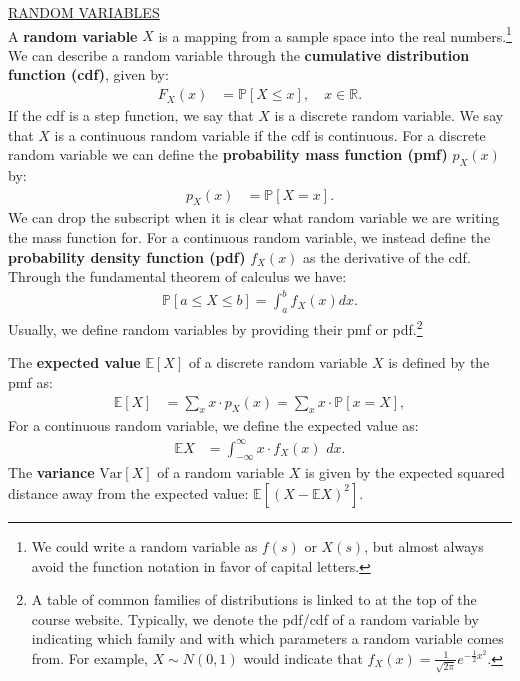 \documentclass{tufte-handout}
\newcommand{\E}{\mathbb{E}}
\newcommand{\V}{\text{Var}}
\begin{document}
\noindent
\underline{RANDOM VARIABLES} \\
A \textbf{random variable} $X$ is a mapping from a sample space into the
real numbers.\footnote{
  We could write a random variable as $f(s)$ or $X(s)$, but almost
  always avoid the function notation in favor of capital letters.
} We can describe a random variable through the \textbf{cumulative
distribution function (cdf)}, given by: 
\begin{align*}
F_X(x) &= \mathbb{P}[ X \leq x ], \quad x \in \mathbb{R}.
\end{align*}
If the cdf is a step function, we say that $X$ is a discrete
random variable. We say that $X$ is a continuous random variable if the
cdf is continuous. For a discrete random variable we can
define the \textbf{probability mass function (pmf)} $p_X(x)$ by:
\begin{align*}
p_X(x) &= \mathbb{P}[ X = x ].
\end{align*}
We can drop the subscript when it is clear what random variable we are
writing the mass function for.
For a continuous random variable, we instead define the
\textbf{probability density function (pdf)} $f_X(x)$ as the derivative
of the cdf. Through the fundamental theorem of calculus we have:
\begin{align*}
\mathbb{P}[ a \leq X \leq b] = \int_{a}^b f_X(x) dx.
\end{align*}
Usually, we define random variables by providing their pmf or pdf.\footnote{
  A table of common families of distributions is linked to at the top of 
  the course website. Typically, we denote the pdf/cdf of a random variable
  by indicating which family and with which parameters a random variable
  comes from. For example, $X \sim N(0, 1)$ would indicate that
  $f_X(x) = \frac{1}{\sqrt{2\pi}} e^{-\frac{1}{2}x^2}$.
}

The \textbf{expected value} $\E[X]$ of a discrete random variable $X$ is
defined by the pmf as:
\begin{align*}
\mathbb{E}[ X ] &= \sum_{x} x \cdot p_X(x) = \sum_{x} x \cdot \mathbb{P}[ x = X ],
\end{align*}
For a continuous random variable, we define the expected value as:
\begin{align*}
\mathbb{E} X &= \int_{-\infty}^{\infty} x \cdot f_X(x) \, \, dx.
\end{align*}
The \textbf{variance} $\V[X]$ of a random variable $X$ is given by the
expected squared distance away from the expected value: 
$\E[(X - \E X)^2]$.
\end{document}
